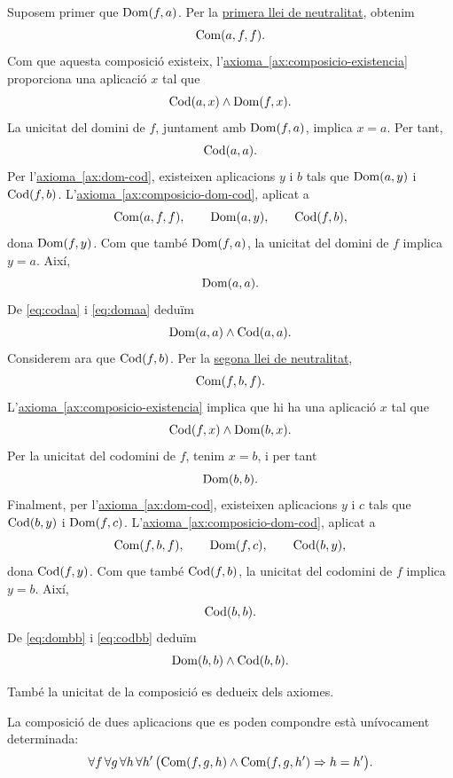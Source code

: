 \begin{prova}
Suposem primer que \(\operatorname{Dom}(f,a)\). Per la \hyperref[ax:neutralitat]{primera llei de neutralitat}, obtenim
\[
\operatorname{Com}(a,f,f).
\]
Com que aquesta composició existeix, l'\hyperref[ax:composicio-existencia]{axioma~\ref*{ax:composicio-existencia}} proporciona una aplicació \(x\) tal que
\[
\operatorname{Cod}(a,x)\land\operatorname{Dom}(f,x).
\]
La unicitat del domini de \(f\), juntament amb \(\operatorname{Dom}(f,a)\), implica \(x=a\). Per tant,
\begin{equation}\label{eq:codaa}
\operatorname{Cod}(a,a).
\end{equation}
Per l'\hyperref[ax:dom-cod]{axioma~\ref*{ax:dom-cod}}, existeixen aplicacions \(y\) i \(b\) tals que \(\operatorname{Dom}(a,y)\) i \(\operatorname{Cod}(f,b)\). L'\hyperref[ax:composicio-dom-cod]{axioma~\ref*{ax:composicio-dom-cod}}, aplicat a
\[
\operatorname{Com}(a,f,f),\qquad \operatorname{Dom}(a,y),\qquad \operatorname{Cod}(f,b),
\]
dona \(\operatorname{Dom}(f,y)\). Com que també \(\operatorname{Dom}(f,a)\), la unicitat del domini de \(f\) implica \(y=a\). Així,
\begin{equation}\label{eq:domaa}
\operatorname{Dom}(a,a).
\end{equation}
De \eqref{eq:codaa} i \eqref{eq:domaa} deduïm
\[
\operatorname{Dom}(a,a)\land\operatorname{Cod}(a,a).
\]
Considerem ara que \(\operatorname{Cod}(f,b)\). Per la \hyperref[ax:neutralitat]{segona llei de neutralitat},
\[
\operatorname{Com}(f,b,f).
\]
L'\hyperref[ax:composicio-existencia]{axioma~\ref*{ax:composicio-existencia}} implica que hi ha una aplicació \(x\) tal que
\[
\operatorname{Cod}(f,x)\land\operatorname{Dom}(b,x).
\]
Per la unicitat del codomini de \(f\), tenim \(x=b\), i per tant
\begin{equation}\label{eq:dombb}
\operatorname{Dom}(b,b).
\end{equation}
Finalment, per l'\hyperref[ax:dom-cod]{axioma~\ref*{ax:dom-cod}}, existeixen aplicacions \(y\) i \(c\) tals que \(\operatorname{Cod}(b,y)\) i \(\operatorname{Dom}(f,c)\). L'\hyperref[ax:composicio-dom-cod]{axioma~\ref*{ax:composicio-dom-cod}}, aplicat a
\[
\operatorname{Com}(f,b,f),\qquad \operatorname{Dom}(f,c),\qquad \operatorname{Cod}(b,y),
\]
dona \(\operatorname{Cod}(f,y)\). Com que també \(\operatorname{Cod}(f,b)\), la unicitat del codomini de \(f\) implica \(y=b\). Així,
\begin{equation}\label{eq:codbb}
\operatorname{Cod}(b,b).
\end{equation}
De \eqref{eq:dombb} i \eqref{eq:codbb} deduïm
\[
\operatorname{Dom}(b,b)\land\operatorname{Cod}(b,b).
\]
\end{prova}

També la unicitat de la composició es dedueix dels axiomes.

\begin{proposicio}\label{prop:composicio-unica}
La composició de dues aplicacions que es poden compondre està unívocament determinada:
\[
\forall f \, \forall g \, \forall h \, \forall h' \, \bigl(\operatorname{Com}(f,g,h)\land\operatorname{Com}(f,g,h')\Rightarrow h=h'\bigr).
\]
\end{proposicio}

